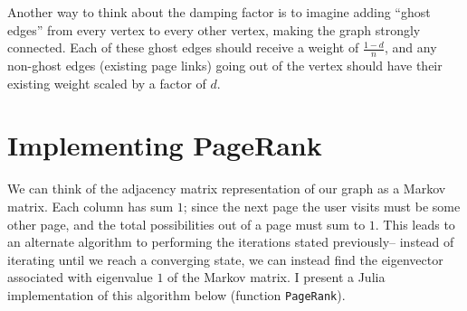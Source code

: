 \documentclass{article}
\begin{document}
Another way to think about the damping factor is to imagine adding ``ghost edges'' from every vertex to every other vertex, making the graph strongly connected. Each of these ghost edges should receive a weight of $\frac{1-d}{n}$, and any non-ghost edges (existing page links) going out of the vertex should have their existing weight scaled by a factor of $d$. 

\section{Implementing PageRank}
We can think of the adjacency matrix representation of our graph as a Markov matrix. Each column has sum $1$; since the next page the user visits must be some other page, and the total possibilities out of a page must sum to $1$. This leads to an alternate algorithm to performing the iterations stated previously-- instead of iterating until we reach a converging state, we can instead find the eigenvector associated with eigenvalue $1$ of the Markov matrix. I present a Julia implementation of this algorithm below (function \texttt{PageRank}).
\end{document}
